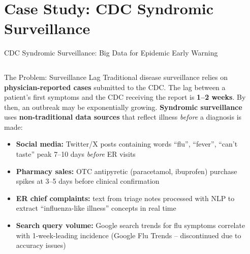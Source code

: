 \documentclass[aspectratio=169,10pt]{beamer}
\begin{document}
\section{Case Study: CDC Syndromic Surveillance}

\begin{frame}{CDC Syndromic Surveillance: Big Data for Epidemic Early Warning}
  \begin{columns}[T]
      \begin{block}{The Problem: Surveillance Lag}
        Traditional disease surveillance relies on \textbf{physician-reported cases} submitted to the CDC.  The lag between a patient's first symptoms and the CDC receiving the report is \textbf{1--2 weeks}.  By then, an outbreak may be exponentially growing.
        \vspace{4pt}
        \textbf{Syndromic surveillance} uses \textbf{non-traditional data sources} that reflect illness \textit{before} a diagnosis is made:
        \begin{itemize}
          \item \textbf{Social media:} Twitter/X posts containing words ``flu'', ``fever'', ``can't taste'' peak 7--10 days \textit{before} ER visits
          \item \textbf{Pharmacy sales:} OTC antipyretic (paracetamol, ibuprofen) purchase spikes at 3--5 days before clinical confirmation
          \item \textbf{ER chief complaints:} text from triage notes processed with NLP to extract ``influenza-like illness'' concepts in real time
          \item \textbf{Search query volume:} Google search trends for flu symptoms correlate with 1-week-leading incidence (Google Flu Trends -- discontinued due to accuracy issues)
        \end{itemize}
      \end{block}

      \begin{center}
\end{center}
\end{columns}
\end{frame}
\end{document}
